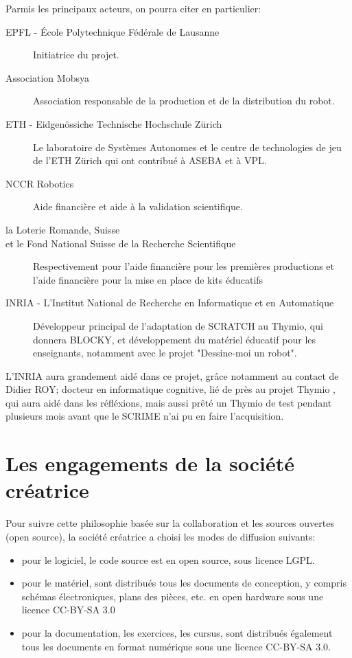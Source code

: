 \documentclass[a4paper, 12pt]{report}
\begin{document}
Parmis les principaux acteurs, on pourra citer en particulier:
\begin{description}
\item[EPFL - École Polytechnique Fédérale de Lausanne] Initiatrice du projet.
\item[Association Mobsya] Association responsable de la production et de la distribution du robot.
\item[ETH - Eidgenössiche Technische Hochschule Zürich] Le laboratoire de Systèmes Autonomes et le centre de technologies de jeu de l'ETH Zürich qui ont contribué à ASEBA et à VPL.
\item[NCCR Robotics] Aide financière et aide à la validation scientifique.
\item[la Loterie Romande, Suisse]
\item[et le Fond National Suisse de la Recherche Scientifique] Respectivement pour l'aide financière pour les premières productions et l'aide financière pour la mise en place de kits éducatifs
\item[INRIA - L'Institut National de Recherche en Informatique et en Automatique] Développeur principal de l'adaptation de SCRATCH au Thymio, qui donnera BLOCKY, et développement du matériel éducatif pour les enseignants, notamment avec le projet "Dessine-moi un robot". 
\end{description} 

L'INRIA aura grandement aidé dans ce projet, grâce notamment au contact de Didier ROY; docteur en informatique cognitive, lié de près au projet Thymio \pageref{thymio}, qui aura aidé dans les réfléxions, mais aussi prêté un Thymio de test pendant plusieurs mois avant que le SCRIME n'ai pu en faire l'acquisition.

\section{Les engagements de la société créatrice}
Pour suivre cette philosophie basée sur la collaboration et les sources ouvertes (open source), la société créatrice a choisi les modes de diffusion suivants:
\begin{itemize}
\item pour le logiciel, le code source est en open source, sous licence LGPL.
\item pour le matériel, sont distribués tous les documents de conception, y compris schémas électroniques, plans des pièces, etc. en open hardware sous une licence CC-BY-SA 3.0
\item pour la documentation, les exercices, les cursus, sont distribués également tous les documents en format numérique sous une licence CC-BY-SA 3.0.
\end{itemize}
\end{document}
